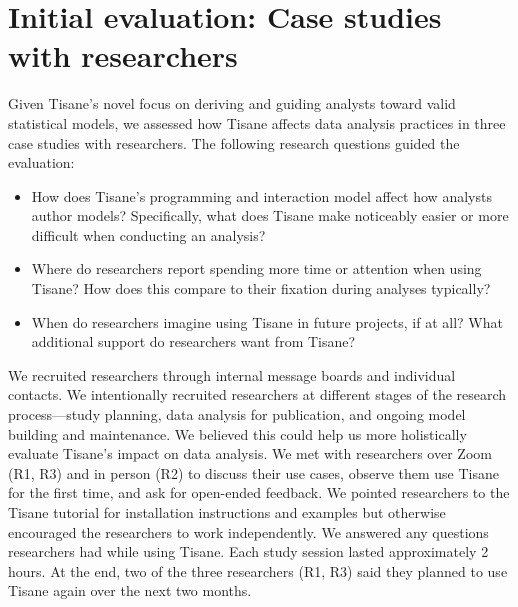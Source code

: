 \section{Initial evaluation: Case studies with researchers}\label{sec:tisane_case_studies}
Given Tisane's novel focus on deriving and
guiding analysts toward valid statistical models, we assessed how Tisane affects
data analysis practices in three case studies with researchers. The following research questions guided
the evaluation:
\begin{itemize}
    \item \rqWorkflow How does Tisane's programming and interaction model
    affect how analysts author models? Specifically, what does Tisane make
    noticeably easier or more difficult when conducting an analysis?
    \item \rqCognitive Where do researchers report spending more
    time or attention when using Tisane? How does this compare to their
    fixation during analyses typically?
    \item \rqFuture When do researchers imagine using Tisane
    in future projects, if at all? What additional support do researchers want
    from Tisane? 
\end{itemize}

We recruited researchers through internal message boards and individual
contacts. We intentionally recruited researchers at different stages of the
research process---study planning, data analysis for publication, and ongoing
model building and maintenance. We believed this could help us more holistically
evaluate Tisane's impact on data analysis. We met with researchers over Zoom
(R1, R3) and in person (R2) to discuss their use cases, observe them use
Tisane for the first time, and ask for open-ended feedback. We pointed researchers to the Tisane tutorial for
installation instructions and examples but otherwise encouraged the researchers
to work independently. We answered any questions researchers had while using Tisane.
Each study session lasted approximately 2 hours. At the end, two of the three
researchers (R1, R3) said they planned to use Tisane again over the next two months.

